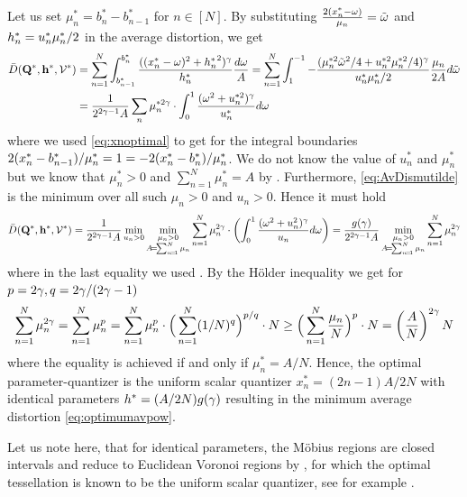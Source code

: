 \documentclass[12pt,onecolumn,final,letterpaper]{IEEEtran}
\newcounter{example}[section]
\renewcommand{\vP}{\mathbf Q}
\newcommand{\Vor}{\ensuremath{\mathcal{V}}}         %
\newcommand{\Dis}{\ensuremath{D}}                    %
\newcommand{\AvDis}{\ensuremath{\bar{\Dis}}}         %
\begin{document}
  Let us set $\mu_n^*=b_n^*-b_{n-1}^*$ for $n\in[N]$. By substituting $\frac{2(x_n^*-\omega)}{\mu_n}={  \tilde{\omega} }$ and
  $h^{*}_n=u^*_n \mu_n^*/2$  in the average distortion, we get 
  \begin{align}
    \AvDis(\vP^*,\vh^*,\Vor^*)&=\sum_{n=1}^N \int_{b_{n-1}^*}^{b_n^*} 
       \frac{ ((\pGlob_n-\ome)^2+{\hGlob_n}^2)^{\gam}}{\hGlob_n}\frac{d\ome}{A} 
       = \sum_{n=1}^N \int_{1}^{-1} -\frac{  (\mu_n^{*2} \tome^2/4 + u_n^{*2}\mu_n^{*2}/4)^{\gam}}{u_n^* \mu_n^*/2}
    \frac{\mu_n}{2A}d\tome\notag\\
    &= \frac{1}{ 2^{2\gam-1}A}\sum_n \mu_n^{*2\gam}\cdot\int_0^1 \frac{(\ome^2+u^{*2}_n)^{\gam}}{u^*_n}d
    \ome\label{eq:AvDismutilde} 
  \end{align}
  where we used \eqref{eq:xnoptimal} to get for the integral boundaries
  $2(x^{*}_n-b_{n-1}^*)/\mu_n^*=1=-2(x^{*}_n-b_{n}^*)/\mu^*_n$.  We do not know the value of $u^*_n$ and $\mu_n^*$ but
  we know that $\mu_n^*>0$ and $\sum_{n=1}^N\mu_n^*=A$ by . Furthermore, \eqref{eq:AvDismutilde} is
  the minimum over all such  $\mu_n>0$ and $u_n>0$. Hence it must hold
  \begin{align}
    \AvDis(\vP^*,\vh^*,\Vor^*)
    = \frac{1}{2^{2\gam-1}A} \min_{u_n>0} \min_{\substack{\mu_n>0\\ A\!=\! \sum_{n\!=\!1}^N \mu_n}} 
    \sum_{n=1}^N \mu_n^{2\gam}\cdot\left(\int_0^1 
      \frac{(\ome^2+u^2_n)^{\gam}}{u_n}d \ome\right)
      = \frac{g(\gam)}{2^{2\gam-1}A}  
\min_{\substack{\mu_n>0\\ A\!=\! \sum_{n\!=\!1}^N \mu_n}} 
      \sum_{n=1}^N \mu_n^{2\gam}  \end{align}
  where in the last equality we used . 
  By the Hölder inequality we get for $p=2\gamma, q=2\gamma/(2\gamma-1)$ 
  \begin{align}
    \sum_{n=1}^N \mu_n^{2\gamma}=\sum_{n=1}^N \mu_n^p  = \sum_{n=1}^N \mu_n^p \cdot\Big(\sum_{n=1}^N (1/N)^q \Big)^{p/q} \cdot N
    \geq\Big( \sum_{n=1}^N \frac{\mu_n }{N}\Big)^p \cdot N =
    \left(\frac{A}{N}\right)^{2\gamma}N\notag
  \end{align}
  where the equality is achieved if and only if $\mu_n^*=A/N$. Hence, the optimal parameter-quantizer is the 
  uniform scalar quantizer $x_n^*=(2n-1)A/2N$ with identical parameters $h^*=(A/2N)g(\gamma)$ resulting in the
  minimum average distortion \eqref{eq:optimumavpow}.

  Let us note here, that for identical parameters, the Möbius regions are closed intervals and reduce to Euclidean
  Voronoi regions by ,
  for which the optimal tessellation is known to be the uniform scalar quantizer, see for example \cite{GN98}. 
\fi
\end{document}
